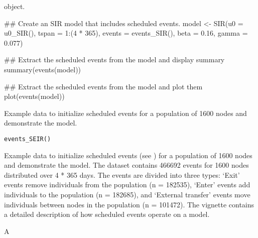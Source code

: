 \documentclass[letterpaper]{book}
\begin{document}
%
\begin{Value}
 object.
\end{Value}
%
\begin{Examples}
\begin{ExampleCode}
## Create an SIR model that includes scheduled events.
model <- SIR(u0     = u0_SIR(),
             tspan  = 1:(4 * 365),
             events = events_SIR(),
             beta   = 0.16,
             gamma  = 0.077)

## Extract the scheduled events from the model and display summary
summary(events(model))

## Extract the scheduled events from the model and plot them
plot(events(model))
\end{ExampleCode}
\end{Examples}
%
\begin{Description}
Example data to initialize scheduled events for a population of
1600 nodes and demonstrate the  model.
\end{Description}
%
\begin{Usage}
\begin{verbatim}
events_SEIR()
\end{verbatim}
\end{Usage}
%
\begin{Details}
Example data to initialize scheduled events (see
) for a population of 1600 nodes
and demonstrate the  model. The dataset
contains 466692 events for 1600 nodes distributed over 4 * 365
days. The events are divided into three types: `Exit'
events remove individuals from the population (n = 182535),
`Enter' events add individuals to the population (n =
182685), and `External transfer' events move individuals
between nodes in the population (n = 101472). The vignette
contains a detailed description of how scheduled events operate on
a model.
\end{Details}
%
\begin{Value}
A 
\end{Value}
%
\end{document}
